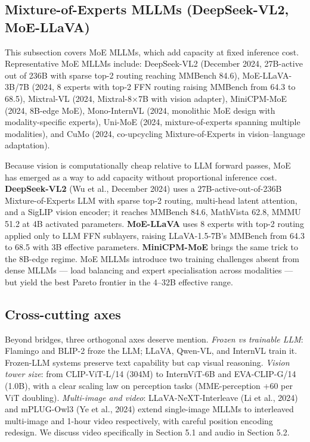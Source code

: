 \subsection{Mixture-of-Experts MLLMs (DeepSeek-VL2, MoE-LLaVA)}\label{mixture-of-experts-mllms-deepseek-vl2-moe-llava}

This subsection covers MoE MLLMs, which add capacity at fixed inference cost. Representative MoE MLLMs include: DeepSeek-VL2 (December 2024, 27B-active out of 236B with sparse top-2 routing reaching MMBench 84.6), MoE-LLaVA-3B/7B (2024, 8 experts with top-2 FFN routing raising MMBench from 64.3 to 68.5), Mixtral-VL (2024, Mixtral-8×7B with vision adapter), MiniCPM-MoE (2024, 8B-edge MoE), Mono-InternVL (2024, monolithic MoE design with modality-specific experts), Uni-MoE (2024, mixture-of-experts spanning multiple modalities), and CuMo (2024, co-upcycling Mixture-of-Experts in vision--language adaptation).

Because vision is computationally cheap relative to LLM forward passes, MoE has emerged as a way to add capacity without proportional inference cost. \textbf{DeepSeek-VL2} (Wu et al., December 2024) uses a 27B-active-out-of-236B Mixture-of-Experts LLM with sparse top-2 routing, multi-head latent attention, and a SigLIP vision encoder; it reaches MMBench 84.6, MathVista 62.8, MMMU 51.2 at 4B activated parameters. \textbf{MoE-LLaVA} uses 8 experts with top-2 routing applied only to LLM FFN sublayers, raising LLaVA-1.5-7B's MMBench from 64.3 to 68.5 with 3B effective parameters. \textbf{MiniCPM-MoE} brings the same trick to the 8B-edge regime. MoE MLLMs introduce two training challenges absent from dense MLLMs --- load balancing and expert specialisation across modalities --- but yield the best Pareto frontier in the 4--32B effective range.

\subsection{Cross-cutting axes}\label{cross-cutting-axes}

Beyond bridges, three orthogonal axes deserve mention. \emph{Frozen vs trainable LLM}: Flamingo and BLIP-2 froze the LLM; LLaVA, Qwen-VL, and InternVL train it. Frozen-LLM systems preserve text capability but cap visual reasoning. \emph{Vision tower size}: from CLIP-ViT-L/14 (304M) to InternViT-6B and EVA-CLIP-G/14 (1.0B), with a clear scaling law on perception tasks (MME-perception +60 per ViT doubling). \emph{Multi-image and video}: LLaVA-NeXT-Interleave (Li et al., 2024) and mPLUG-Owl3 (Ye et al., 2024) extend single-image MLLMs to interleaved multi-image and 1-hour video respectively, with careful position encoding redesign. We discuss video specifically in Section 5.1 and audio in Section 5.2.

